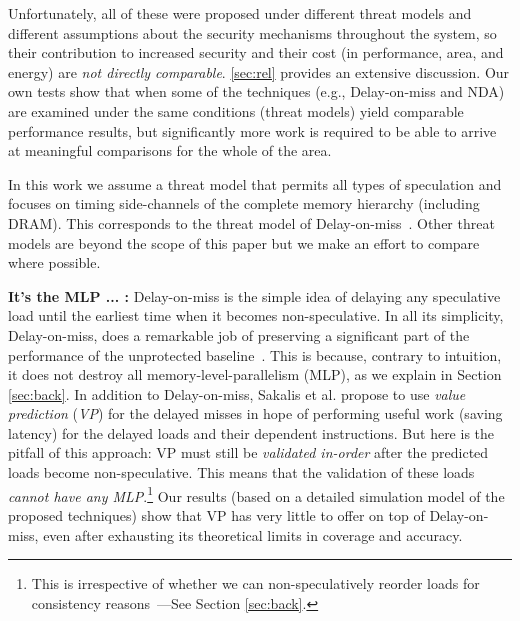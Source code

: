 Unfortunately, all of these were proposed under different threat models and different assumptions about the security mechanisms throughout the system, so their contribution to increased security and their cost (in performance, area, and energy) are \emph{not directly comparable}. \autoref{sec:rel} provides an extensive discussion. Our own tests show that when some of the techniques (e.g., Delay-on-miss and NDA) are examined under the same conditions (threat models) yield comparable performance results, but significantly more work is required to be able to arrive at meaningful comparisons for the whole of the area.

In this work we assume a threat model that permits all types of speculation and focuses on timing side-channels of the complete memory hierarchy (including DRAM). This corresponds to the threat model of 
Delay-on-miss~\cite{sakalis2019efficient}. Other threat models are beyond the scope of this paper {\color{red} but we make an effort to compare where possible}. %

\noindent \textbf{It's the MLP ... :} Delay-on-miss is the simple idea of delaying any speculative load until the earliest time when it becomes non-speculative. In all its simplicity, Delay-on-miss, does a remarkable job of preserving a significant part of the performance of the unprotected baseline~\cite{sakalis2019efficient}. This is because, contrary to intuition, it does not destroy all memory-level-parallelism (MLP), as we explain in Section \ref{sec:back}.
In addition to Delay-on-miss, Sakalis et al. propose to use \emph{value prediction} (\emph{VP}) for the delayed misses in hope of performing useful work (saving latency) for the delayed loads and their dependent instructions. But here is the pitfall of this approach: VP must still be \emph{validated in-order} after the predicted loads become non-speculative. This means that the validation of these loads \emph{cannot have any MLP}.\footnote{This is irrespective of whether we can non-speculatively reorder loads for consistency reasons~\cite{aros-isca17}---See Section \ref{sec:back}.} {\color{red} Our results (based on a detailed simulation model of the proposed techniques) show that VP has very little to offer on top of Delay-on-miss, even after exhausting its theoretical limits in coverage and accuracy.}

